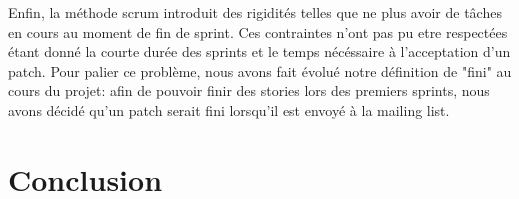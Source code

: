 \documentclass[a4paper, 12pt]{article}
\begin{document}
Enfin, la méthode scrum introduit des rigidités telles que ne plus avoir de tâches en cours au moment de fin de sprint.
Ces contraintes n'ont pas pu etre respectées étant donné la courte durée des sprints et le temps nécéssaire à l'acceptation d'un patch.
Pour palier ce problème, nous avons fait évolué notre définition de "fini" au cours du projet: afin de pouvoir finir des stories lors des premiers sprints, nous avons décidé qu'un patch serait fini lorsqu'il est envoyé à la mailing list. 

\section{Conclusion}
\end{document}

